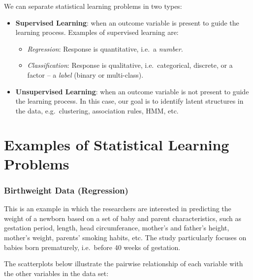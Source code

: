 \documentclass[
]{book}
\providecommand{\tightlist}{%
  \setlength{\itemsep}{0pt}\setlength{\parskip}{0pt}}
\begin{document}
We can separate statistical learning problems in two types:

\begin{itemize}
\tightlist
\item
  \textbf{Supervised Learning}: when an outcome variable is present to guide the learning process. Examples of supervised learning are:

  \begin{itemize}
  \tightlist
  \item
    \emph{Regression}: Response is quantitative, i.e.~a \emph{number.}
  \item
    \emph{Classification}: Response is qualitative, i.e.~categorical, discrete, or a factor -- a \emph{label} (binary or multi-class).
  \end{itemize}
\item
  \textbf{Unsupervised Learning}: when an outcome variable is not present to guide the learning process. In this case, our goal is to identify latent structures in the data, e.g.~clustering, association rules, HMM, etc.
\end{itemize}

\section{Examples of Statistical Learning Problems}\label{examples-of-statistical-learning-problems}

\subsubsection*{\texorpdfstring{ Birthweight Data (Regression) }{ Birthweight Data (Regression) }}\label{birthweight-data-regression}

This is an example in which the researchers are interested in predicting the weight of a newborn based on a set of baby and parent characteristics, such as gestation period, length, head circumferance, mother's and father's height, mother's weight, parents' smoking habits, etc. The study particularly focuses on babies born prematurely, i.e.~before 40 weeks of gestation.

The scatterplots below illustrate the pairwise relationship of each variable with the other variables in the data set:
\end{document}
